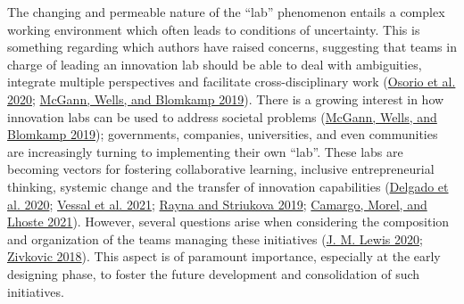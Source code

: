 \documentclass[AMA,STIX1COL,APA,STIX2COL]{WileyNJD-v2}
\begin{document}
The changing and permeable nature of the ``lab'' phenomenon entails a
complex working environment which often leads to conditions of
uncertainty. This is something regarding which authors have raised
concerns, suggesting that teams in charge of leading an innovation lab
should be able to deal with ambiguities, integrate multiple perspectives
and facilitate cross-disciplinary work
(\protect\hyperlink{ref-Osorio2020}{Osorio et al. 2020};
\protect\hyperlink{ref-McGann2019}{McGann, Wells, and Blomkamp 2019}).
There is a growing interest in how innovation labs can be used to
address societal problems (\protect\hyperlink{ref-McGann2019}{McGann,
Wells, and Blomkamp 2019}); governments, companies, universities, and
even communities are increasingly turning to implementing their own
``lab''. These labs are becoming vectors for fostering collaborative
learning, inclusive entrepreneurial thinking, systemic change and the
transfer of innovation capabilities
(\protect\hyperlink{ref-Delgado2020}{Delgado et al. 2020};
\protect\hyperlink{ref-RezaeeVessal2021}{Vessal et al. 2021};
\protect\hyperlink{ref-Rayna2019}{Rayna and Striukova 2019};
\protect\hyperlink{ref-Camargo2021}{Camargo, Morel, and Lhoste 2021}).
However, several questions arise when considering the composition and
organization of the teams managing these initiatives
(\protect\hyperlink{ref-Lewis2020}{J. M. Lewis 2020};
\protect\hyperlink{ref-Zivkovic2018}{Zivkovic 2018}). This aspect is of
paramount importance, especially at the early designing phase, to foster
the future development and consolidation of such initiatives.
\end{document}
